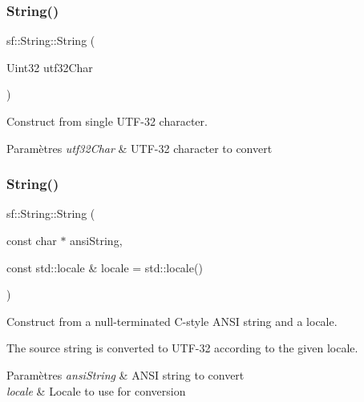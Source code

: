 \subsubsection{\texorpdfstring{String()}{String()}\hspace{0.1cm}{\footnotesize\ttfamily [4/11]}}
{\footnotesize\ttfamily sf\+::\+String\+::\+String (\begin{DoxyParamCaption}\item[{Uint32}]{utf32\+Char }\end{DoxyParamCaption})}



Construct from single U\+T\+F-\/32 character. 


\begin{DoxyParams}{Paramètres}
{\em utf32\+Char} & U\+T\+F-\/32 character to convert \\
\hline
\end{DoxyParams}
\mbox{\label{classsf_1_1String_a57d2b8c289f9894f859564cad034bfc7}} 
\subsubsection{\texorpdfstring{String()}{String()}\hspace{0.1cm}{\footnotesize\ttfamily [5/11]}}
{\footnotesize\ttfamily sf\+::\+String\+::\+String (\begin{DoxyParamCaption}\item[{const char $\ast$}]{ansi\+String,  }\item[{const std\+::locale \&}]{locale = {\ttfamily std\+:\+:locale()} }\end{DoxyParamCaption})}



Construct from a null-\/terminated C-\/style A\+N\+SI string and a locale. 

The source string is converted to U\+T\+F-\/32 according to the given locale.


\begin{DoxyParams}{Paramètres}
{\em ansi\+String} & A\+N\+SI string to convert \\
\hline
{\em locale} & Locale to use for conversion \\
\hline
\end{DoxyParams}
\mbox{\label{classsf_1_1String_a0aa41dcbd17b0c36c74d03d3b0147f1e}} 
